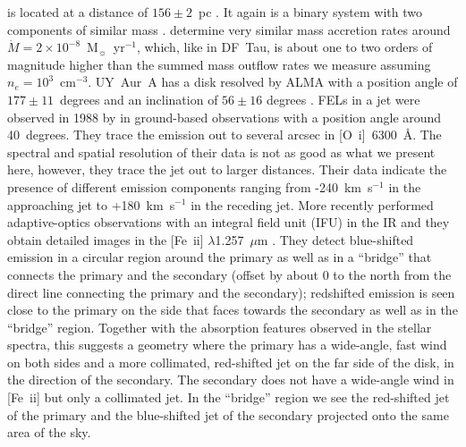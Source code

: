 \documentclass[twocolumn,trackchanges]{aastex63}
\begin{document}
 is  located at a distance of $156\pm2$~pc
\citep{2016A&A...595A...1G,2018A&A...616A...1G}. It again is a binary system
with two components of similar mass \citep[M0 and M2,
  see][]{2003ApJ...583..334H}. \citet{2003ApJ...583..334H} determine very
similar mass accretion rates around
$\dot M=2\times10^{-8}$~M$_{\sun}$~yr$^{-1}$, which, like in DF~Tau, is about
one to two orders of magnitude higher than the summed mass outflow rates we
measure assuming $n_e=10^3$~cm$^{-3}$.
UY~Aur~A has a disk resolved by ALMA with a position angle of $177\pm11$~degrees and an inclination of $56\pm16$ degrees \citep{2014ApJ...784...62A}. FELs in a jet were observed in 1988 by \citet{1997A&AS..126..437H} in ground-based observations with a position angle around 40~degrees. They trace the emission out to several arcsec in [O~{\sc i}]~6300~\AA{}. The spectral and spatial resolution of their data is not as good as what we present here, however, they trace the jet out to larger distances. Their data indicate the presence of different emission components ranging from -240~km~s$^{-1}$ in the approaching jet to +180~km~s$^{-1}$ in the receding jet. More recently \citet{2014ApJ...786...63P}  performed adaptive-optics observations with an integral field unit (IFU) in the IR and they obtain detailed images in the [Fe~{\sc ii}] $\lambda$1.257~$\mu$m . They detect blue-shifted emission in a circular region around the primary as well as in a ``bridge'' that connects the primary and the secondary (offset by about 0 to the north from the direct line connecting the primary and the secondary); redshifted emission is seen close to the primary on the side that faces towards the secondary as well as in the ``bridge'' region. Together with the absorption features observed in the stellar spectra, this suggests a geometry where the primary has a wide-angle, fast wind on both sides and a more collimated, red-shifted jet on the far side of the disk, in the direction of the secondary. The secondary does not have a wide-angle wind in [Fe~{\sc ii}] but only a collimated jet. In the ``bridge'' region we see the red-shifted jet of the primary and the blue-shifted jet of the secondary projected onto the same area of the sky.
\end{document}
